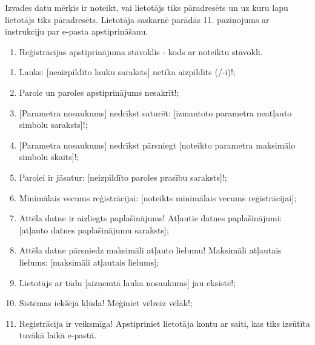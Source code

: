 {
	Izvades datu mērķis ir noteikt, vai lietotājs tiks pāradresēts un uz kuru lapu lietotājs tiks pāradresēts.
	Lietotāja saskarnē parādās 11. paziņojums ar instrukciju par e-pasta
	apstiprināšanu.
	\begin{enumerate}
		\item Reģistrācijas apstiprinājuma stāvoklis - kods ar noteiktu stāvokli.
	\end{enumerate}
}
{
	\begin{enumerate}
		\item Lauks: [neaizpildīto lauku saraksts] netika aizpildīts (/-i)!;
		\item Parole un paroles apstiprinājums nesakrīt!;
		\item {}[Parametra nosaukums] nedrīkst saturēt: [izmantoto parametra neatļauto
		      simbolu saraksts]!;
		\item {}[Parametra nosaukums] nedrīkst pārsniegt [noteikto parametra maksimālo
		      simbolu skaits]!;
		\item Parolei ir jāsatur: [neizpildīto paroles prasību saraksts]!;
		\item Minimālais vecums reģistrācijai: [noteikts minimālais vecums reģistrācijai];
		\item Attēla datne ir aizliegts paplašinājums! Atļautie datnes paplašinājumi: [atļauto datnes paplašinājumu saraksts];
		\item Attēla datne pārsniedz maksimāli atļauto lielumu! Maksimāli atļautais lielums: [maksimāli atļautais lielums];
		\item Lietotājs ar tādu [aizņemtā lauka nosaukums] jau eksistē!;
		\item Sistēmas iekšējā kļūda! Mēģiniet vēlreiz vēlāk!;
		\item Reģistrācija ir veiksmīga! Apstipriniet lietotāja kontu ar saiti, kas tiks izsūtīta tuvākā laikā e-pastā.
	\end{enumerate}
}
